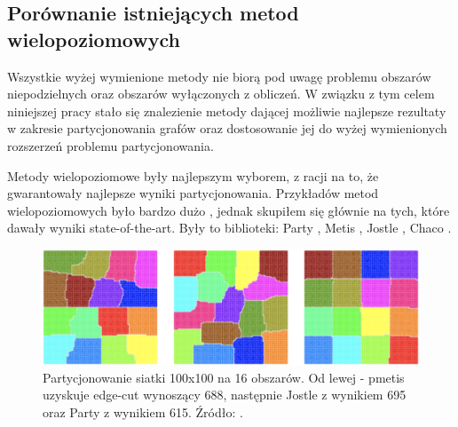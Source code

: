 \subsection{Porównanie istniejących metod wielopoziomowych}

Wszystkie wyżej wymienione metody nie biorą pod uwagę problemu obszarów niepodzielnych oraz obszarów wyłączonych z obliczeń.
W związku z tym celem niniejszej pracy stało się znalezienie metody dającej możliwie najlepsze rezultaty w zakresie partycjonowania grafów oraz
dostosowanie jej do wyżej wymienionych rozszerzeń problemu partycjonowania.

Metody wielopoziomowe były najlepszym wyborem, z racji na to, że gwarantowały najlepsze wyniki partycjonowania.
Przykładów metod wielopoziomowych było bardzo dużo \cite{metis, jostle, Bui1993AHF, 103500, 185177, 279334, inproceedings, 129970, 10.1145/165939.165942},
jednak skupiłem się głównie na tych, które dawały wyniki state-of-the-art. Były to biblioteki:
Party \cite{1364754}, Metis \cite{metis}, Jostle \cite{jostle}, Chaco \cite{inproceedings}.

\begin{figure}[h]
    \centering
    \includegraphics[width=0.7\linewidth]{images/libraries-comparision}
    \caption{Partycjonowanie siatki 100x100 na 16 obszarów. Od lewej - pmetis \cite{metis} uzyskuje edge-cut wynoszący
    688, następnie Jostle \cite{jostle} z wynikiem 695 oraz Party \cite{1364754} z wynikiem 615. Źródło: \cite{1364754}.}
    \label{im:partitioning_results}
\end{figure}

